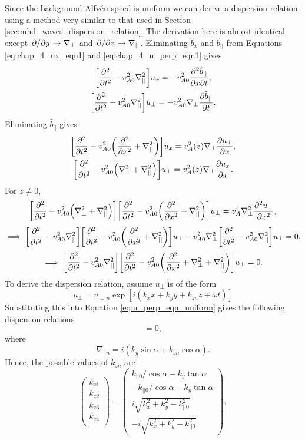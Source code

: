 Since the background Alfv\'en speed is uniform we can derive a dispersion relation using a method very similar to that used in Section \ref{sec:mhd_waves_dispersion_relation}. The derivation here is almost identical except $\pdv*{}{y}\rightarrow\nabla_\perp$ and $\pdv*{}{z}\rightarrow\nabla_{||}$.
Eliminating $\hat{b}_x$ and $\hat{b}_{||}$ from Equations \eqref{eq:chap_4_ux_eqn1} and \eqref{eq:chap_4_u_perp_eqn1} gives
\begin{gather}
    \qty[\pdv[2]{}{t}-v_{A0}^2\nabla_{||}^2]u_x=-v_{A0}^2\pdv{\hat{b}_{||}}{x}{t}, \\
    \qty[\pdv[2]{}{t}-v_{A0}^2\nabla_{||}^2]u_\perp=-v_{A0}^2\nabla_\perp\pdv{\hat{b}_{||}}{t}.
\end{gather}
Eliminating $\hat{b}_{||}$ gives
\begin{gather}
    \label{eq:chap_4_ux_u_perp_eqn_uniform_in_x}
    \qty[\pdv[2]{}{t}-v_{A0}^2\qty(\pdv[2]{}{x}+\nabla_{||}^2)]u_x=v_A^2(z)\nabla_\perp\pdv{u_\perp}{x}, \\
    \qty[\pdv[2]{}{t}-v_{A0}^2\qty(\nabla_\perp^2+\nabla_{||}^2)]u_\perp=v_A^2(z)\nabla_\perp\pdv{u_x}{x}.
\end{gather}
For $z\ne0$,
\[\qty[\pdv[2]{}{t}-v_{A0}^2\qty(\nabla_\perp^2 + \nabla_{||}^2)]\qty[\pdv[2]{}{t}-v_{A0}^2\qty(\pdv[2]{}{x}+\nabla_{||}^2)]u_\perp=v_A^4\nabla_\perp^2 \pdv[2]{u_\perp}{x},\]
\[\implies \qty[\pdv[2]{}{t}-v_{A0}^2\nabla_{||}^2]\qty[\pdv[2]{}{t}-v_{A0}^2\qty(\pdv[2]{}{x}+\nabla_{||}^2)]u_\perp-v_{A0}^2\nabla_\perp^2\qty[\pdv[2]{}{t}-v_{A0}^2\nabla_{||}^2]u_\perp=0,\]
\begin{equation}
    \label{eq:u_perp_eqn_uniform}
    \implies \qty[\pdv[2]{}{t}-v_{A0}^2\nabla_{||}^2]\qty[\pdv[2]{}{t}-v_{A0}^2\qty(\pdv[2]{}{x}+\nabla_\perp^2+\nabla_{||}^2)]u_\perp=0.
\end{equation}
To derive the dispersion relation, assume $u_\perp$ is of the form
\[u_\perp = u_{\perp n}\exp[i(k_x x + k_y y + k_{zn} z + \omega t)]\]
Substituting this into Equation \eqref{eq:u_perp_eqn_uniform} gives the following dispersion relations
\begin{equation}
    [\omega^2+v_{A0}^2\nabla_{||n}^2][\omega^2-v_{A0}^2(k_x^2+k_y^2+k_{zn}^2)]=0,
\end{equation}
where
\begin{equation}
    \nabla_{||n} = i(k_y\sin\alpha+k_{zn}\cos\alpha).
\end{equation}
Hence, the possible values of $k_{zn}$ are
\begin{equation}
\label{eq:chap_4_oblique_field_uniform_dispersion_relation}
\begin{pmatrix}
k_{z1} \\
k_{z2} \\
k_{z3} \\
k_{z4} \\
\end{pmatrix}
=
\begin{pmatrix}
 k_{||0}/\cos\alpha - k_y\tan\alpha \\
-k_{||0}/\cos\alpha - k_y\tan\alpha \\
 i\sqrt{k_x^2+k_y^2 - k_{||0}^2} \\
-i\sqrt{k_x^2+k_y^2 - k_{||0}^2}
\end{pmatrix},
\end{equation}
